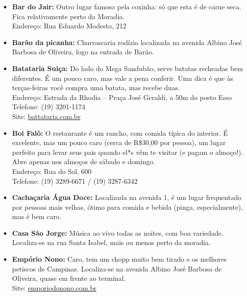 \begin{itemize}
    \item   \textbf{Bar do Jair:} Outro lugar famoso pela coxinha: só que esta é
        de carne seca. Fica relativamente perto da Moradia.
        \\Endereço: Rua Eduardo Modesto, 212

    \item   \textbf{Barão da picanha:} Churrascaria rodízio localizada na
        avenida Albino José Barbosa de Oliveira, logo na entrada de Barão.

    \item   \textbf{Batataria Suiça:} Do lado do Mega Sandubão, serve batatas
        recheadas bem diferentes. É um pouco caro, mas vale a pena conferir. Uma
        dica é que às terças-feiras você compra uma batata, mas recebe duas.
        \\Endereço: Estrada da Rhodia -- Praça José Geraldi, a 50m do posto Esso
        \\Telefone: (19) 3201-1174
        \\Site: \url{battataria.com.br}

    \item   \textbf{Boi Falô:} O restaurante é um rancho, com comida típica do
        interior. É excelente, mas um pouco caro (cerca de R\$30,00 por pessoa),
        um lugar perfeito para levar seus pais quando el*s vêm te visitar (e
        pagam o almoço!). Abre apenas nos almoços de sábado e domingo.
        \\Endereço: Rua do Sol, 600
        \\Telefone: (19) 3289-6671 / (19) 3287-6342%

    \item   \textbf{Cachaçaria Água Doce:} Localizada na avenida 1, é um lugar
        frequentado por pessoas mais velhas, ótimo para comida e bebida (pinga,
        especialmente), mas é bem caro.

    \item   \textbf{Casa São Jorge:} Música ao vivo todas as noites, com boa
        variedade. Localiza-se na rua Santa Isabel, mais ou menos perto da
        moradia.

    \item   \textbf{Empório Nono:} Caro, tem um chopp muito bem tirado e os
        melhores petiscos de Campinas. Localiza-se na avenida Albino José
        Barbosa de Oliveira, quase em frente ao terminal.
        \\Site: \url{emporiodonono.com.br}


\end{itemize}
